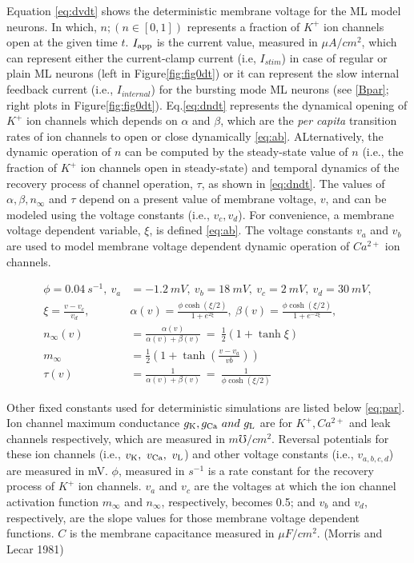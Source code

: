\documentclass[
]{article}
\begin{document}
Equation \eqref{eq:dvdt} shows the deterministic membrane voltage for the ML model neurons. In which, \(n; (n \in [0,1])\) represents a fraction of \(K^+\) ion channels open at the given time \(t\). \(I_{\rm app}\) is the current value, measured in \(\mu A/cm^2\), which can represent either the current-clamp current (i.e, \(I_{stim}\)) in case of regular or plain ML neurons (left in Figure\ref{fig:fig0dt}) or it can represent the slow internal feedback current (i.e., \(I_{internal}\)) for the bursting mode ML neurons (see \ref{Bpar}; right plots in Figure\ref{fig:fig0dt}). Eq.\eqref{eq:dndt} represents the dynamical opening of \(K^+\) ion channels which depends on \(\alpha\) and \(\beta\), which are the \emph{per capita} transition rates of ion channels to open or close dynamically \eqref{eq:ab}. ALternatively, the dynamic operation of \(n\) can be computed by the steady-state value of \(n\) (i.e., the fraction of \(K^+\) ion channels open in steady-state) and temporal dynamics of the recovery process of channel operation, \(\tau\), as shown in \eqref{eq:dndt}. The values of \(\alpha, \beta, n_\infty\) and \(\tau\) depend on a present value of membrane voltage, \(v\), and can be modeled using the voltage constants (i.e., \(v_c, v_d\)). For convenience, a membrane voltage dependent variable, \(\xi\), is defined \eqref{eq:ab}. The voltage constants \(v_a\) and \(v_b\) are used to model membrane voltage dependent dynamic operation of \(Ca^{2+}\) ion channels.

\begin{align}
\nonumber \phi=0.04\ s^{-1},\ v_a&=-1.2\ mV,\ v_b=18\ mV,\ v_c=2\ mV,\ v_d=30\ mV,
\\ \label{eq:ab} \xi = \frac{v-v_c}{v_d},\ 
    &\alpha(v) = \frac{\phi \cosh(\xi/2)}{1+ e^{2\xi}},\ 
    \beta(v) = \frac{\phi \cosh(\xi/2)}{1+ e^{-2\xi}},
\\ \label{eq:nss} n_\infty(v) &= \frac{\alpha(v)}{\alpha(v) + \beta(v)} \ 
    =\  \frac12(1 + \tanh \xi)
\\ \label{eq:mss} m_\infty &= \frac12\left(1+ \tanh(\frac{v-v_a}{vb})\right)
\\ \label{eq:tau} \tau(v) &= \frac{1}{\alpha(v) + \beta(v)} \ 
    =\  \frac{1}{\phi \cosh(\xi/2)}
\end{align}

Other fixed constants used for deterministic simulations are listed below \eqref{eq:par}. Ion channel maximum conductance \(g_{\rm K}, g_{\rm Ca}\ and\ g_{\rm L}\) are for \(K^+, Ca^{2+}\) and leak channels respectively, which are measured in \(m\mho/cm^2\). Reversal potentials for these ion channels (i.e., \(v_{\rm K},\ v_{\rm Ca},\ v_{\rm L}\)) and other voltage constants (i.e., \(v_{a,b,c,d}\)) are measured in mV. \(\phi\), measured in \(s^{-1}\) is a rate constant for the recovery process of \(K^+\) ion channels. \(v_a\) and \(v_c\) are the voltages at which the ion channel activation function \(m_{\infty}\) and \(n_{\infty}\), respectively, becomes 0.5; and \(v_b\) and \(v_d\), respectively, are the slope values for those membrane voltage dependent functions. \(C\) is the membrane capacitance measured in \(\mu F/cm^2\). (Morris and Lecar 1981)
\end{document}
